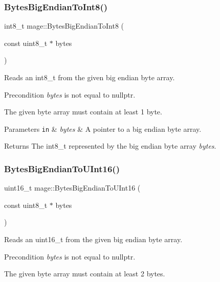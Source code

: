 \subsubsection{\texorpdfstring{Bytes\+Big\+Endian\+To\+Int8()}{BytesBigEndianToInt8()}}
{\footnotesize\ttfamily int8\+\_\+t mage\+::\+Bytes\+Big\+Endian\+To\+Int8 (\begin{DoxyParamCaption}\item[{const uint8\+\_\+t $\ast$}]{bytes }\end{DoxyParamCaption})\hspace{0.3cm}{\ttfamily [noexcept]}}

Reads an int8\+\_\+t from the given big endian byte array.

\begin{DoxyPrecond}{Precondition}
{\itshape bytes} is not equal to {\ttfamily nullptr}. 

The given byte array must contain at least 1 byte. 
\end{DoxyPrecond}

\begin{DoxyParams}[1]{Parameters}
\mbox{\tt in}  & {\em bytes} & A pointer to a big endian byte array. \\
\hline
\end{DoxyParams}
\begin{DoxyReturn}{Returns}
The {\ttfamily int8\+\_\+t} represented by the big endian byte array {\itshape bytes}. 
\end{DoxyReturn}
\hypertarget{namespacemage_ab99ec7df40eb1c2dbb8106fc03401f1d}{}\label{namespacemage_ab99ec7df40eb1c2dbb8106fc03401f1d} 
\subsubsection{\texorpdfstring{Bytes\+Big\+Endian\+To\+U\+Int16()}{BytesBigEndianToUInt16()}}
{\footnotesize\ttfamily uint16\+\_\+t mage\+::\+Bytes\+Big\+Endian\+To\+U\+Int16 (\begin{DoxyParamCaption}\item[{const uint8\+\_\+t $\ast$}]{bytes }\end{DoxyParamCaption})\hspace{0.3cm}{\ttfamily [noexcept]}}

Reads an uint16\+\_\+t from the given big endian byte array.

\begin{DoxyPrecond}{Precondition}
{\itshape bytes} is not equal to {\ttfamily nullptr}. 

The given byte array must contain at least 2 bytes. 
\end{DoxyPrecond}

